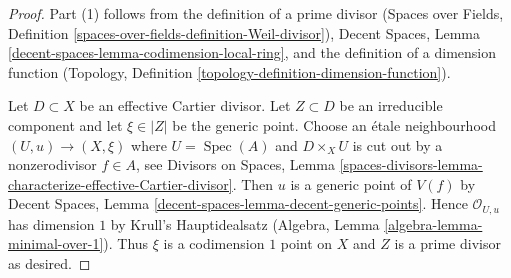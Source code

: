 \documentclass[10pt,a4paper]{amsart}
\theoremstyle{plain}
\theoremstyle{definition}
\theoremstyle{remark}
\numberwithin{equation}{subsection}
\def\Spec{\mathop{\mathrm{Spec}}}
\begin{document}
\begin{proof}
Part (1) follows from the definition of a prime divisor
(Spaces over Fields, Definition
\ref{spaces-over-fields-definition-Weil-divisor}),
Decent Spaces, Lemma \ref{decent-spaces-lemma-codimension-local-ring},
and the definition of a dimension function
(Topology, Definition \ref{topology-definition-dimension-function}).

\medskip\noindent
Let $D \subset X$ be an effective Cartier divisor. Let $Z \subset D$
be an irreducible component and let $\xi \in |Z|$ be the generic point.
Choose an \'etale neighbourhood $(U, u) \to (X, \xi)$ where $U = \Spec(A)$
and $D \times_X U$ is cut out by a nonzerodivisor $f \in A$, see
Divisors on Spaces, Lemma
\ref{spaces-divisors-lemma-characterize-effective-Cartier-divisor}.
Then $u$ is a generic point of $V(f)$ by
Decent Spaces, Lemma \ref{decent-spaces-lemma-decent-generic-points}.
Hence $\mathcal{O}_{U, u}$ has dimension $1$ by
Krull's Hauptidealsatz (Algebra, Lemma \ref{algebra-lemma-minimal-over-1}).
Thus $\xi$ is a codimension $1$ point on $X$ and $Z$ is a prime
divisor as desired.
\end{proof}
\end{document}
